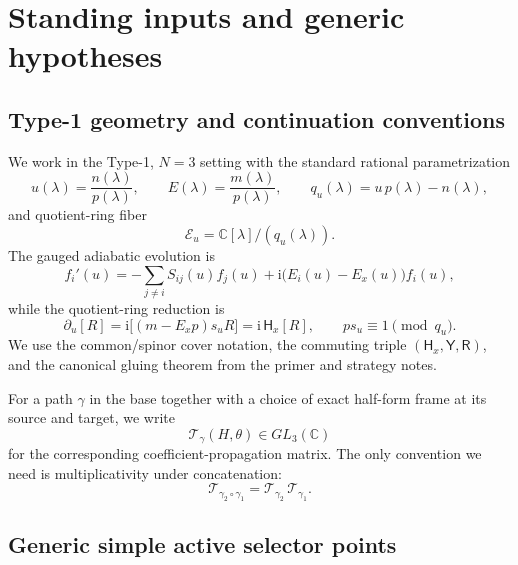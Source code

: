 \documentclass[11pt]{article}
\numberwithin{equation}{section}
\theoremstyle{definition}
\newcommand{\C}{\mathbb C}
\newcommand{\ii}{\mathrm i}
\newcommand{\E}{\mathcal E}
\newcommand{\Hx}{\mathsf H_x}
\newcommand{\Yop}{\mathsf Y}
\newcommand{\Rop}{\mathsf R}
\newcommand{\Tfun}{\mathcal T}
\begin{document}
\section{Standing inputs and generic hypotheses}

\subsection{Type-1 geometry and continuation conventions}

We work in the Type-1, $N=3$ setting with the standard rational parametrization
\begin{equation}
\label{eq:uE}
 u(\lambda)=\frac{n(\lambda)}{p(\lambda)},
 \qquad
 E(\lambda)=\frac{m(\lambda)}{p(\lambda)},
 \qquad
 q_u(\lambda)=u\,p(\lambda)-n(\lambda),
\end{equation}
and quotient-ring fiber
\begin{equation}
\label{eq:Eu}
 \E_u=\C[\lambda]/(q_u(\lambda)).
\end{equation}
The gauged adiabatic evolution is
\begin{equation}
\label{eq:adiabatic}
 f_i'(u)=-\sum_{j\neq i}S_{ij}(u)f_j(u)+\ii\bigl(E_i(u)-E_x(u)\bigr)f_i(u),
\end{equation}
while the quotient-ring reduction is
\begin{equation}
\label{eq:reduced}
 \partial_u[R]=\ii\bigl[(m-E_xp)s_uR\bigr]=\ii\,\Hx[R],
 \qquad
 p s_u\equiv 1\pmod{q_u}.
\end{equation}
We use the common/spinor cover notation, the commuting triple $(\Hx,\Yop,\Rop)$, and the canonical gluing theorem from the primer and strategy notes.

For a path $\gamma$ in the base together with a choice of exact half-form frame at its source and target, we write
\begin{equation}
\label{eq:Tgamma-def}
 \Tfun_\gamma(H,\theta)\in GL_3(\C)
\end{equation}
for the corresponding coefficient-propagation matrix. The only convention we need is multiplicativity under concatenation:
\begin{equation}
\label{eq:path-mult}
 \Tfun_{\gamma_2\circ\gamma_1}=\Tfun_{\gamma_2}\,\Tfun_{\gamma_1}.
\end{equation}

\subsection{Generic simple active selector points}
\end{document}
